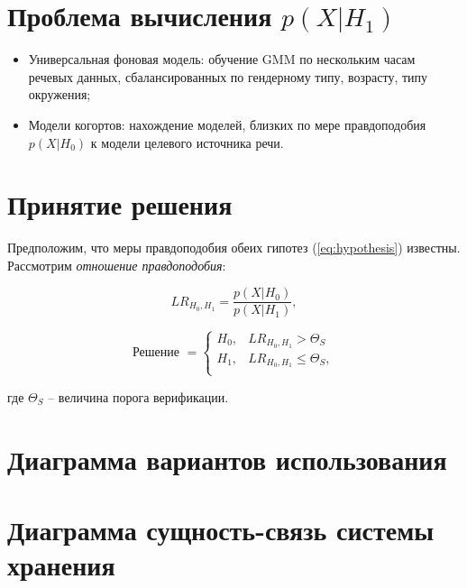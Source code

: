 \documentclass[12pt]{article}
\newcommand{\important}[1]{\emph{#1}}
\begin{document}
\section{Проблема вычисления $p(X|H_1)$}

\begin{itemize}
\item Универсальная фоновая модель: обучение GMM по нескольким часам речевых данных, сбалансированных по гендерному типу, возрасту, типу окружения;
\item Модели когортов: нахождение моделей, близких по мере правдоподобия $p(X|H_0)$ к модели целевого источника речи.
\end{itemize}

\section{Принятие решения}

Предположим, что меры правдоподобия обеих гипотез (\ref{eq:hypothesis}) известны. Рассмотрим \important{отношение правдоподобия}:

\begin{equation}
\label{eq:lr}
LR_{H_0, H_1} = \frac{p(X|H_0)}{p(X|H_1)},
\end{equation}

\begin{equation}
\label{eq:decision}
\textrm{Решение } = \left\{ 
    \begin{array}{ll}
        H_0, & LR_{H_0, H_1} > \Theta_{S} \\
        H_1, & LR_{H_0, H_1} \leq \Theta_{S}, \\
    \end{array}
\right.
\end{equation}

\noindent где $\Theta_{S}$ -- величина порога верификации.

\section{Диаграмма вариантов использования}

\begin{figure}[h!]
\end{figure}

\section{Диаграмма сущность-связь системы хранения}
\end{document}
